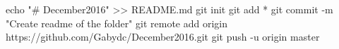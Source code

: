 echo "# December2016" >> README.md
git init
git add *
git commit -m "Create readme of the folder"
git remote add origin https://github.com/Gabydc/December2016.git
git push -u origin master
